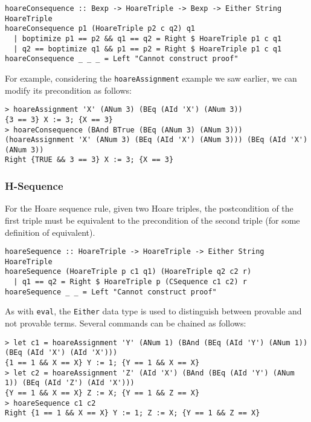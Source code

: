 \documentclass{article}
\begin{document}
\begin{lstlisting}
hoareConsequence :: Bexp -> HoareTriple -> Bexp -> Either String HoareTriple
hoareConsequence p1 (HoareTriple p2 c q2) q1
  | boptimize p1 == p2 && q1 == q2 = Right $ HoareTriple p1 c q1
  | q2 == boptimize q1 && p1 == p2 = Right $ HoareTriple p1 c q1
hoareConsequence _ _ _ = Left "Cannot construct proof"
\end{lstlisting}

For example, considering the \texttt{hoareAssignment} example we saw earlier, we can modify its precondition as follows:

\begin{lstlisting}
> hoareAssignment 'X' (ANum 3) (BEq (AId 'X') (ANum 3))
{3 == 3} X := 3; {X == 3}
> hoareConsequence (BAnd BTrue (BEq (ANum 3) (ANum 3))) (hoareAssignment 'X' (ANum 3) (BEq (AId 'X') (ANum 3))) (BEq (AId 'X') (ANum 3))
Right {TRUE && 3 == 3} X := 3; {X == 3}
\end{lstlisting}

\subsubsection{H-Sequence}

For the Hoare sequence rule, given two Hoare triples, the postcondition of the first triple must be equivalent to the precondition of the second triple (for some definition of equivalent).

\begin{lstlisting}
hoareSequence :: HoareTriple -> HoareTriple -> Either String HoareTriple
hoareSequence (HoareTriple p c1 q1) (HoareTriple q2 c2 r)
  | q1 == q2 = Right $ HoareTriple p (CSequence c1 c2) r
hoareSequence _ _ = Left "Cannot construct proof"
\end{lstlisting}

As with \texttt{eval}, the \texttt{Either} data type is used to distinguish between provable and not provable terms. Several commands can be chained as follows:

\begin{lstlisting}
> let c1 = hoareAssignment 'Y' (ANum 1) (BAnd (BEq (AId 'Y') (ANum 1)) (BEq (AId 'X') (AId 'X')))
{1 == 1 && X == X} Y := 1; {Y == 1 && X == X}
> let c2 = hoareAssignment 'Z' (AId 'X') (BAnd (BEq (AId 'Y') (ANum 1)) (BEq (AId 'Z') (AId 'X')))
{Y == 1 && X == X} Z := X; {Y == 1 && Z == X}
> hoareSequence c1 c2
Right {1 == 1 && X == X} Y := 1; Z := X; {Y == 1 && Z == X}
\end{lstlisting}
\end{document}
